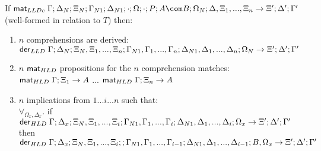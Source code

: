    If $\mc \Gamma; \Delta_N; \Xi_N; \Gamma_{N1}; \Delta_{N1}; \cdot; \Omega; \cdot; P; A \com B; \Omega_N; \Delta, \Xi_1, ..., \Xi_n \rightarrow \Xi'; \Delta'; \Gamma'$ (well-formed in relation to $T$) then:
   
   \begin{enumerate}
      \item $n$ comprehensions are derived:\\
      $\mathsf{der}_{LLD} \; \Gamma; \Delta_N; \Xi_N, \Xi_1, ..., \Xi_n; \Gamma_{N1}, \Gamma_1, ..., \Gamma_n; \Delta_{N1}, \Delta_1, ..., \Delta_n; \Omega_N \rightarrow \Xi'; \Delta'; \Gamma'$
      \item $n$ $\mathsf{mat}_{HLD} \;$propositions for the $n$ comprehension matches:\\
      $\mathsf{mat}_{HLD} \; \Gamma; \Xi_1 \rightarrow A$ ... $\mathsf{mat}_{HLD} \; \Gamma; \Xi_n \rightarrow A$
      \item $n$ implications from $1...i...n$ such that: \\
      $\forall_{\Omega_x, \Delta_x}.$ if $\mathsf{der}_{HLD} \; \Gamma; \Delta_x; \Xi_N, \Xi_1, ..., \Xi_i; \Gamma_{N1}, \Gamma_1, ..., \Gamma_i; \Delta_{N1}, \Delta_1, ..., \Delta_i; \Omega_x \rightarrow \Xi'; \Delta'; \Gamma'$ then \\$\mathsf{der}_{HLD} \; \Gamma; \Delta_x; \Xi_N, \Xi_1, ..., \Xi_i; ; \Gamma_{N1}, \Gamma_1, ..., \Gamma_{i-1}; \Delta_{N1}, \Delta_1, ..., \Delta_{i-1}; B, \Omega_x \rightarrow \Xi'; \Delta'; \Gamma'$
   \end{enumerate}
   \fi
